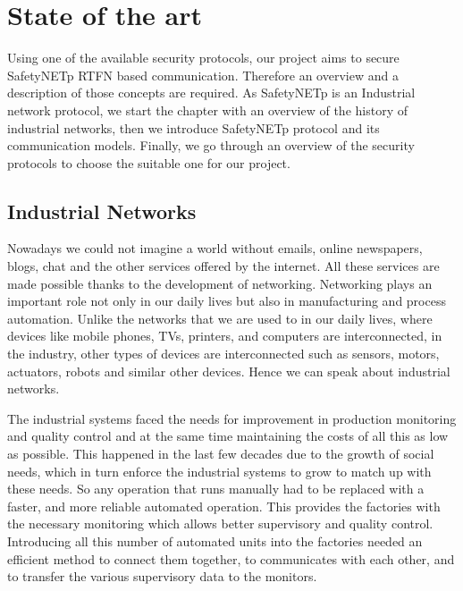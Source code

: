 %
%
%
%
%

\chapter{State of the art}
\label{chap:chapter2}

Using one of the available security protocols, our project aims to secure SafetyNETp \ac{RTFN} based communication.
Therefore an overview and a description of those concepts are required. As SafetyNETp is an Industrial network protocol, we start the chapter with an overview of the history of industrial networks, then
we introduce SafetyNETp protocol and its communication models. Finally, we go through an overview of
the security protocols to choose the suitable one for our project.


\section{Industrial Networks} %
Nowadays we could not imagine a world without emails, online newspapers, blogs,
chat and the other services offered by the internet.
All these services are made possible thanks to the development of networking.
Networking plays an important role not only in our daily lives but also in
manufacturing and process automation. Unlike the networks that we are used to
in our daily lives, where devices like mobile phones, TVs, printers, and
computers are interconnected, in the industry, other types of devices are
interconnected such as sensors, motors, actuators, robots and similar other
devices. Hence we can speak about industrial networks.

The industrial systems faced the needs for improvement in production
monitoring and quality control and at the same time maintaining
the costs of all this as low as possible. This happened in the
last few decades due to the growth of social needs, which in turn enforce
the industrial systems to grow to match up with these needs.
So any operation that runs manually had to be replaced with a faster, and more
reliable automated operation. This provides the factories with
the necessary monitoring which allows better supervisory and quality control.
Introducing all this number of automated units into the factories needed an efficient
method to connect them together, to communicates with each other, and to transfer the
various supervisory data to the monitors.

